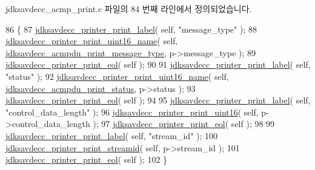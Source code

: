 jdksavdecc\+\_\+acmp\+\_\+print.\+c 파일의 84 번째 라인에서 정의되었습니다.


\begin{DoxyCode}
86 \{
87     \hyperlink{group__util_gaf7818b24143b3c7502926a425a242ff5}{jdksavdecc\_printer\_print\_label}( \textcolor{keyword}{self}, \textcolor{stringliteral}{"message\_type"} );
88     \hyperlink{group__util_ga62486d864a66773d19bbbe23cebf346a}{jdksavdecc\_printer\_print\_uint16\_name}( \textcolor{keyword}{self}, 
      \hyperlink{group__acmp__print_gac8bc1b2ddf5d5788ef9846be06446b2f}{jdksavdecc\_acmpdu\_print\_message\_type}, p->message\_type );
89     \hyperlink{group__util_gacda56c9d3d24593a52c999682fa6e6e3}{jdksavdecc\_printer\_print\_eol}( \textcolor{keyword}{self} );
90 
91     \hyperlink{group__util_gaf7818b24143b3c7502926a425a242ff5}{jdksavdecc\_printer\_print\_label}( \textcolor{keyword}{self}, \textcolor{stringliteral}{"status"} );
92     \hyperlink{group__util_ga62486d864a66773d19bbbe23cebf346a}{jdksavdecc\_printer\_print\_uint16\_name}( \textcolor{keyword}{self}, 
      \hyperlink{group__acmp__print_ga9d62c7c54ab6eb010490acdf16d8c57f}{jdksavdecc\_acmpdu\_print\_status}, p->status );
93     \hyperlink{group__util_gacda56c9d3d24593a52c999682fa6e6e3}{jdksavdecc\_printer\_print\_eol}( \textcolor{keyword}{self} );
94 
95     \hyperlink{group__util_gaf7818b24143b3c7502926a425a242ff5}{jdksavdecc\_printer\_print\_label}( \textcolor{keyword}{self}, \textcolor{stringliteral}{"control\_data\_length"} );
96     \hyperlink{group__util_ga9793e0ff8e7ed25d957282ee6b257ce2}{jdksavdecc\_printer\_print\_uint16}( \textcolor{keyword}{self}, p->control\_data\_length );
97     \hyperlink{group__util_gacda56c9d3d24593a52c999682fa6e6e3}{jdksavdecc\_printer\_print\_eol}( \textcolor{keyword}{self} );
98 
99     \hyperlink{group__util_gaf7818b24143b3c7502926a425a242ff5}{jdksavdecc\_printer\_print\_label}( \textcolor{keyword}{self}, \textcolor{stringliteral}{"stream\_id"} );
100     \hyperlink{group__util_ga8439b1cdb450c02010bc8318643f67a2}{jdksavdecc\_printer\_print\_streamid}( \textcolor{keyword}{self}, p->stream\_id );
101     \hyperlink{group__util_gacda56c9d3d24593a52c999682fa6e6e3}{jdksavdecc\_printer\_print\_eol}( \textcolor{keyword}{self} );
102 \}
\end{DoxyCode}



